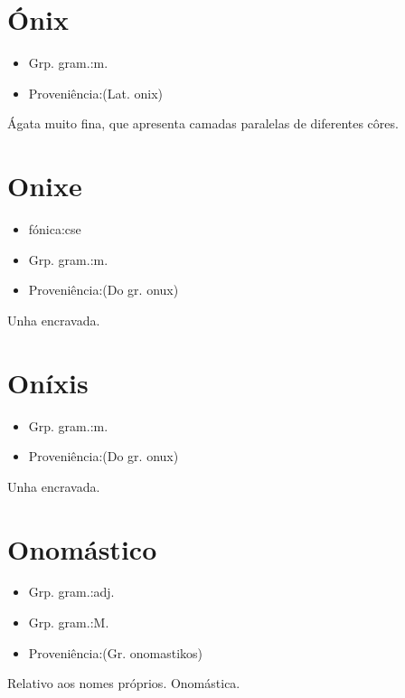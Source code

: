 \section{Ónix}
\begin{itemize}
\item {Grp. gram.:m.}
\end{itemize}
\begin{itemize}
\item {Proveniência:(Lat. \textunderscore onix\textunderscore )}
\end{itemize}
Ágata muito fina, que apresenta camadas paralelas de diferentes côres.
\section{Onixe}
\begin{itemize}
\item {fónica:cse}
\end{itemize}
\begin{itemize}
\item {Grp. gram.:m.}
\end{itemize}
\begin{itemize}
\item {Proveniência:(Do gr. \textunderscore onux\textunderscore )}
\end{itemize}
Unha encravada.
\section{Oníxis}
\begin{itemize}
\item {Grp. gram.:m.}
\end{itemize}
\begin{itemize}
\item {Proveniência:(Do gr. \textunderscore onux\textunderscore )}
\end{itemize}
Unha encravada.
\section{Onomástico}
\begin{itemize}
\item {Grp. gram.:adj.}
\end{itemize}
\begin{itemize}
\item {Grp. gram.:M.}
\end{itemize}
\begin{itemize}
\item {Proveniência:(Gr. \textunderscore onomastikos\textunderscore )}
\end{itemize}
Relativo aos nomes próprios.
Onomástica.

